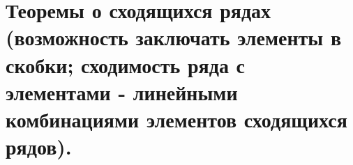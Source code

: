 {
	\section{Теоремы о сходящихся рядах (возможность заключать элементы в скобки; сходимость ряда с элементами -
	линейными комбинациями элементов сходящихся рядов).}

	\newpage
}